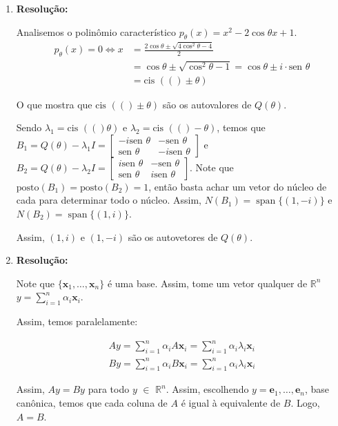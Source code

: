 \documentclass[leqno]{article}
\DeclareMathOperator{\spn}{span}
\newcommand{\pst}[1]{\text{posto}(#1)}
\newcommand{\cis}[1]{\text{cis }(#1)}
\begin{document}
\begin{enumerate}
    \item 
    
    \textbf{Resolução:}
    
    Analisemos o polinômio característico $p_{\theta}(x)=x^2-2\cos\theta x+1$.
    \begin{align*}
        p_{\theta}(x)=0\iff x&=\frac{2\cos{\theta}\pm \sqrt{4\cos^2\theta-4}}{2}\\
        &=\cos{\theta}\pm \sqrt{\cos^2\theta -1}=\cos{\theta}\pm i\cdot \text{sen }\theta \\
        &=\cis(\pm \theta)
    \end{align*}
    
    O que mostra que $\cis(\pm \theta)$ são os autovalores de $Q(\theta)$.
    
    Sendo $\lambda_1=\cis(\theta)$ e $\lambda_2=\cis(-\theta)$, temos que $B_1=Q(\theta)-\lambda_1I=\begin{bmatrix}-i\text{sen }\theta & -\text{sen }\theta\\
    \text{sen }\theta & -i\text{sen }\theta\end{bmatrix}$ e $B_2=Q(\theta)-\lambda_2I=\begin{bmatrix}i\text{sen }\theta & -\text{sen }\theta\\
    \text{sen }\theta & i\text{sen }\theta\end{bmatrix}$. Note que $\pst{B_1}=\pst{B_2}=1$, então basta achar um vetor do núcleo de cada para determinar todo o núcleo. Assim, $N(B_1)=\spn\{(1, -i)\}$ e $N(B_2)=\spn\{(1, i)\}$.
    
    Assim, $(1,i)$ e $(1,-i)$ são os autovetores de $Q(\theta)$.
    
    \item 
    
    \textbf{Resolução:}
    
    Note que $\{\textbf{x}_1,\dots,\textbf{x}_n\}$ é uma base. Assim, tome um vetor qualquer de $\mathbb{R}^n$ $y=\sum_{i=1}^n\alpha_i\textbf{x}_i$.
    
    Assim, temos paralelamente:
    
    \begin{align*}
        Ay=\sum_{i=1}^n\alpha_iA\textbf{x}_i=\sum_{i=1}^n\alpha_i\lambda_i\textbf{x}_i\\
        By=\sum_{i=1}^n\alpha_iB\textbf{x}_i=\sum_{i=1}^n\alpha_i\lambda_i\textbf{x}_i
    \end{align*}
    
    Assim, $Ay=By$ para todo $y$ $\in$ $\mathbb{R}^n$. Assim, escolhendo $y=\textbf{e}_1,\dots,\textbf{e}_n$, base canônica, temos que cada coluna de $A$ é igual à equivalente de $B$. Logo, $A=B$.
    

\end{enumerate}
\end{document}
